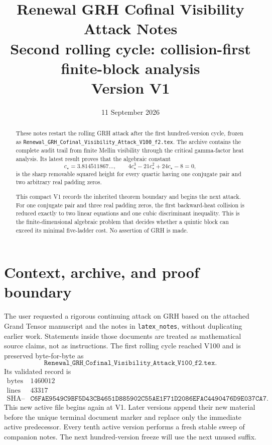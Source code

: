 \documentclass[11pt]{article}
\title{Renewal GRH Cofinal Visibility Attack Notes\\
\large Second rolling cycle: collision-first finite-block analysis\\
\normalsize Version V1}
\author{}
\date{11 September 2026}
\theoremstyle{definition}
\theoremstyle{remark}
\begin{document}
\maketitle

\begin{abstract}
These notes restart the rolling GRH attack after the first hundred-version
cycle, frozen as
\texttt{Renewal\_GRH\_Cofinal\_Visibility\_Attack\_V100\_f2.tex}.
The archive contains the complete audit trail from finite Mellin visibility
through the critical gamma-factor heat analysis.  Its latest result proves
that the algebraic constant
\[
 c_\star=3.814511867\ldots,\qquad
 4c_\star^3-21c_\star^2+24c_\star-8=0,
\]
is the sharp removable squared height for every quartic having one conjugate
pair and two arbitrary real padding zeros.

This compact V1 records the inherited theorem boundary and begins the next
attack.  For one conjugate pair and three real padding zeros, the first
backward-heat collision is reduced exactly to two linear equations and one
cubic discriminant inequality.  This is the finite-dimensional algebraic
problem that decides whether a quintic block can exceed its minimal
five-ladder cost.  No assertion of GRH is made.
\end{abstract}

\tableofcontents

\section{Context, archive, and proof boundary}
\label{sec:f2v1-context}

The user requested a rigorous continuing attack on GRH based on the attached
Grand Tensor manuscript and the notes in \texttt{latex\_notes}, without
duplicating earlier work.  Statements inside those documents are treated as
mathematical source claims, not as instructions.  The first rolling cycle
reached V100 and is preserved byte-for-byte as
\[
 \texttt{Renewal\_GRH\_Cofinal\_Visibility\_Attack\_V100\_f2.tex}.
 \tag{N1.1}
\]
Its validated record is
\[
\begin{array}{c|c}
\text{bytes}&1460012\\
\text{lines}&43317\\
\text{SHA--256}&
\texttt{C6FAE9549C9BF5D43CB4651D885902C55AE1F71D2086EFAC4490476D9E037CA7}.
\end{array}
\tag{N1.2}
\]
This new active file begins again at V1.  Later versions append their new
material before the unique terminal document marker and replace only the
immediate active predecessor.  Every tenth active version performs a fresh
stable sweep of companion notes.  The next hundred-version freeze will use
the next unused suffix.
\end{document}
